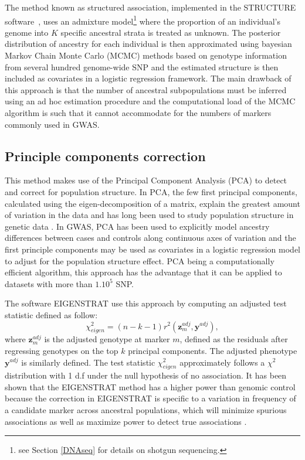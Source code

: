 \documentclass[]{book}
\let\rmarkdownfootnote\footnote%
\def\footnote{\protect\rmarkdownfootnote}
\begin{document}
The method known as structured association, implemented in the STRUCTURE
software~\citep{pritchard2000inference}, uses an admixture model\footnote{see Section \ref{DNAseq} for details on shotgun sequencing.} where
the proportion of an individual's genome into \(K\) specific ancestral
strata is treated as unknown. The posterior distribution of ancestry for
each individual is then approximated using bayesian Markov Chain Monte
Carlo (MCMC) methods based on genotype information from several hundred
genome-wide SNP and the estimated structure is then included as
covariates in a logistic regression framework. The main drawback of this
approach is that the number of ancestral subpopulations must be inferred
using an ad hoc estimation procedure and the computational load of the
MCMC algorithm is such that it cannot accommodate for the numbers of
markers commonly used in GWAS.

\hypertarget{PCC}{%
\subsection{Principle components correction}\label{PCC}}

This method makes use of the Principal Component Analysis (PCA) to
detect and correct for population structure. In PCA, the few first
principal components, calculated using the eigen-decomposition of a
matrix, explain the greatest amount of variation in the data and has
long been used to study population structure in genetic data
\citep{reich2008principal}. In GWAS, PCA has been used to explicitly model
ancestry differences between cases and controls along continuous axes of
variation and the first principle components may be used as covariates
in a logistic regression model to adjust for the population structure
effect. PCA being a computationally efficient algorithm, this approach
has the advantage that it can be applied to datasets with more than
\(1.10^5\) SNP.

The software EIGENSTRAT \citep{price_principal_2006} use this approach by
computing an adjusted test statistic defined as follow:
\[\chi^2_{eigen} = (n-k-1) r^2(\mathbf{z}_m^{adj},\mathbf{y}^{adj}),\] where
\(\mathbf{z}_m^{adj}\) is the adjusted genotype at marker \(m\), defined as the
residuals after regressing genotypes on the top \(k\) principal
components. The adjusted phenotype \(\mathbf{y}^{adj}\) is similarly defined. The
test statistic \(\chi^2_{eigen}\) approximately follows a \(\chi^2\)
distribution with 1 d.f under the null hypothesis of no association. It
has been shown that the EIGENSTRAT method has a higher power than
genomic control because the correction in EIGENSTRAT is specific to a
variation in frequency of a candidate marker across ancestral
populations, which will minimize spurious associations as well as
maximize power to detect true associations \citep{price_principal_2006} .
\end{document}
